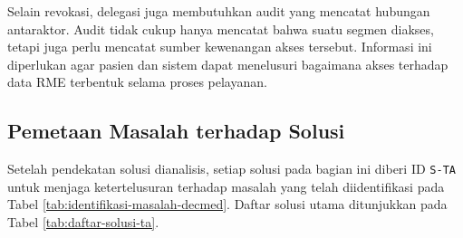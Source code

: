 \documentclass[bahasa, 12pt, a4paper, onecolumn, oneside, final]{report}
\begin{document}
Selain revokasi, delegasi juga membutuhkan audit yang mencatat hubungan antaraktor. Audit tidak cukup hanya mencatat bahwa suatu segmen diakses, tetapi juga perlu mencatat sumber kewenangan akses tersebut. Informasi ini diperlukan agar pasien dan sistem dapat menelusuri bagaimana akses terhadap data RME terbentuk selama proses pelayanan. \subsection{Pemetaan Masalah terhadap Solusi}
\label{subsec:pemetaan-kebutuhan-solusi}
\label{subsec:pemetaan-masalah-solusi}

Setelah pendekatan solusi dianalisis, setiap solusi pada bagian ini diberi ID \texttt{S-TA} untuk menjaga ketertelusuran terhadap masalah yang telah diidentifikasi pada Tabel \ref{tab:identifikasi-masalah-decmed}. Daftar solusi utama ditunjukkan pada Tabel \ref{tab:daftar-solusi-ta}.
\end{document}
